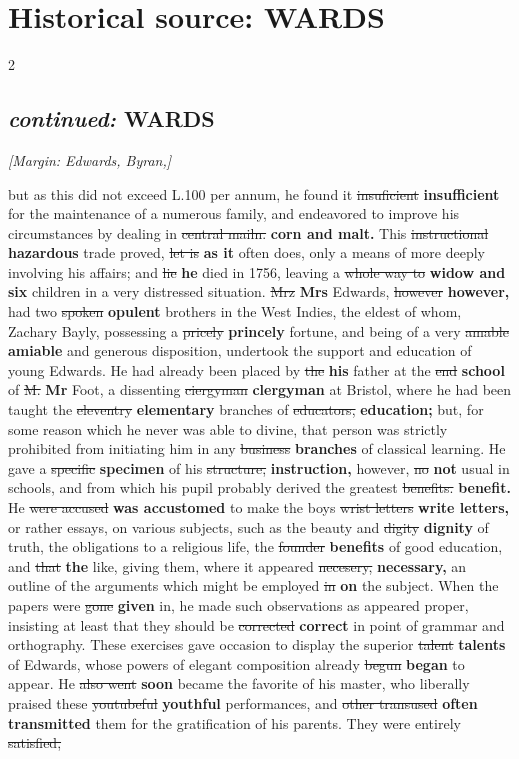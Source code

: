 \documentclass[10pt]{article}
\begin{document}
\section*{Historical source: WARDS}
\begin{multicols}{2}
\subsection*{\textit{continued:} WARDS}
{\small\itshape [Margin: Edwards, Byran,]}\par
but as this did not exceed L.100 per annum, he found it \sout{insuficient} \textbf{insufficient} for the maintenance of a numerous family, and endeavored to improve his circumstances by dealing in \sout{central mailn.} \textbf{corn and malt.} This \sout{instructional} \textbf{hazardous} trade proved, \sout{let is} \textbf{as it} often does, only a means of more deeply involving his affairs; and \sout{lie} \textbf{he} died in 1756, leaving a \sout{whole way to} \textbf{widow and six} children in a very distressed situation. \sout{Mrz} \textbf{Mrs} Edwards, \sout{however} \textbf{however,} had two \sout{spoken} \textbf{opulent} brothers in the West Indies, the eldest of whom, Zachary Bayly, possessing a \sout{pricely} \textbf{princely} fortune, and being of a very \sout{amable} \textbf{amiable} and generous disposition, undertook the support and education of young Edwards. He had already been placed by \sout{the} \textbf{his} father at the \sout{end} \textbf{school} of \sout{M.} \textbf{Mr} Foot, a dissenting \sout{ciergyman} \textbf{clergyman} at Bristol, where he had been taught the \sout{eleventry} \textbf{elementary} branches of \sout{educators,} \textbf{education;} but, for some reason which he never was able to divine, that person was strictly prohibited from initiating him in any \sout{business} \textbf{branches} of classical learning. He gave a \sout{specific} \textbf{specimen} of his \sout{structure,} \textbf{instruction,} however, \sout{no} \textbf{not} usual in schools, and from which his pupil probably derived the greatest \sout{benefits.} \textbf{benefit.} He \sout{were accused} \textbf{was accustomed} to make the boys \sout{wrist letters} \textbf{write letters,} or rather essays, on various subjects, such as the beauty and \sout{digity} \textbf{dignity} of truth, the obligations to a religious life, the \sout{founder} \textbf{benefits} of good education, and \sout{that} \textbf{the} like, giving them, where it appeared \sout{necesery,} \textbf{necessary,} an outline of the arguments which might be employed \sout{in} \textbf{on} the subject. When the papers were \sout{gone} \textbf{given} in, he made such observations as appeared proper, insisting at least that they should be \sout{corrected} \textbf{correct} in point of grammar and orthography. These exercises gave occasion to display the superior \sout{talent} \textbf{talents} of Edwards, whose powers of elegant composition already \sout{begun} \textbf{began} to appear. He \sout{also went} \textbf{soon} became the favorite of his master, who liberally praised these \sout{youtubeful} \textbf{youthful} performances, and \sout{other transused} \textbf{often transmitted} them for the gratification of his parents. They were entirely \sout{satisfied,} 
\end{multicols}
\end{document}
